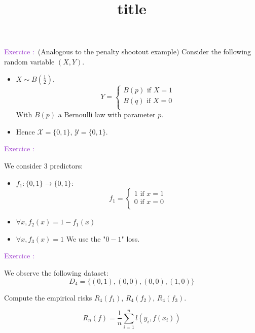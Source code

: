 \documentclass[usenames,dvipsnames]{beamer}
\title[FTML]{title}
\date{} %
\newcounter{numexos}%
\newcommand{\exercice}[1]{%
\addtocounter{numexos}{1}%
\textcolor{DarkOrchid}{Exercice\,\thenumexos\,:}\,#1%
}
\begin{document}
\begin{frame}
\titlepage %
\end{frame}

\begin{frame}{}
    \exercice{} (Analogous to the penalty shootout example) Consider the following random variable $(X,Y)$.
    \addtocounter{numexos}{-1}
    \begin{itemize}
        \item 
            $ X\sim B( \frac{1}{2} )$, 
         $$
            Y = \left\{
                \begin{array}{ll}
                    B(p) \text{ if } X=1   \\
                    B(q) \text{ if } X=0   \\
                \end{array}
                \right.
                $$
    With $B(p)$ a Bernoulli law with parameter $p$.
\item Hence $ \mathcal{X} = \{0, 1\}$, $ \mathcal{Y}  = \{0, 1\}$.
    \end{itemize}
\end{frame}

\begin{frame}{}
    \exercice{}
    \addtocounter{numexos}{-1}
 We consider $3$ predictors: 
    \begin{itemize}
        \item 
    $f_1: \{0, 1\} \rightarrow \{0, 1\} $:
         $$
            f_1 = \left\{
                \begin{array}{ll}
                    1 \text{ if } x=1   \\
                    0 \text{ if } x=0   \\
                \end{array}
                \right.
                $$

	    \item $\forall x, f_2(x)=1-f_1(x)$
		\item $\forall x, f_3(x)=1$
    We use the "$0-1$" loss.
    \end{itemize}

\end{frame}

\begin{frame}{}
    \exercice{}

    We observe the following dataset:
    \begin{equation}
        D_4 = \{(0, 1), (0, 0), (0, 0), (1, 0)\}
    \end{equation}

    Compute the empirical risks $R_4(f_1)$, $R_4(f_2)$, $R_4(f_3)$.

    \begin{equation*}
	R_n(f) = \frac{1}{n} \sum^{n}_{i=1} l(y_i, f(x_i))
    \end{equation*}
    
\end{frame}
\end{document}
